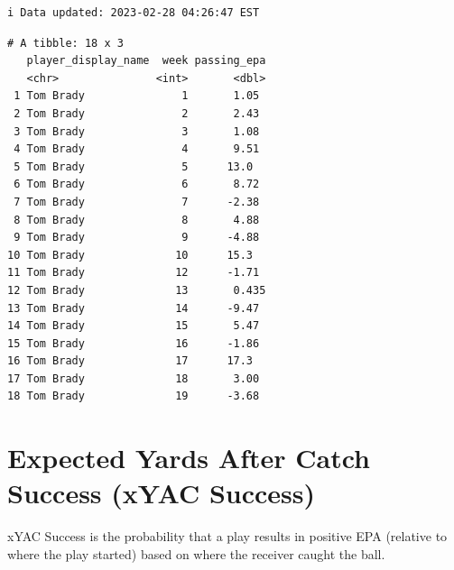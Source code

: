\documentclass[
  letterpaper,
]{krantz}
\begin{document}
\begin{verbatim}
i Data updated: 2023-02-28 04:26:47 EST
\end{verbatim}

\begin{verbatim}
# A tibble: 18 x 3
   player_display_name  week passing_epa
   <chr>               <int>       <dbl>
 1 Tom Brady               1       1.05 
 2 Tom Brady               2       2.43 
 3 Tom Brady               3       1.08 
 4 Tom Brady               4       9.51 
 5 Tom Brady               5      13.0  
 6 Tom Brady               6       8.72 
 7 Tom Brady               7      -2.38 
 8 Tom Brady               8       4.88 
 9 Tom Brady               9      -4.88 
10 Tom Brady              10      15.3  
11 Tom Brady              12      -1.71 
12 Tom Brady              13       0.435
13 Tom Brady              14      -9.47 
14 Tom Brady              15       5.47 
15 Tom Brady              16      -1.86 
16 Tom Brady              17      17.3  
17 Tom Brady              18       3.00 
18 Tom Brady              19      -3.68 
\end{verbatim}

\hypertarget{expected-yards-after-catch-success-xyac-success}{%
\section{Expected Yards After Catch Success (xYAC
Success)}\label{expected-yards-after-catch-success-xyac-success}}

xYAC Success is the probability that a play results in positive EPA
(relative to where the play started) based on where the receiver caught
the ball.
\end{document}
